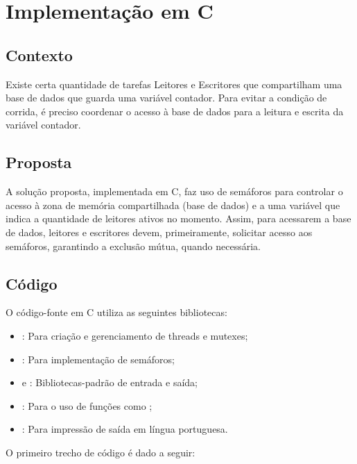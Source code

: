 \documentclass[
	12pt,				%
	openright,			%
	oneside,			%
	a4paper,			%
	chapter=TITLE,		%
	english,			%
	french,				%
	spanish,			%
	brazil				%
	]{abntex2}
\theoremstyle{definition}
\begin{document}
\section{Implementação em C}

\subsection{Contexto}

Existe certa quantidade de tarefas Leitores e Escritores que compartilham uma base de dados que guarda uma variável contador. Para evitar a condição de corrida, é preciso coordenar o acesso à base de dados para a leitura e escrita da variável contador.

\subsection{Proposta} 

A solução proposta, implementada em C, faz uso de semáforos para controlar o acesso à zona de memória compartilhada (base de dados) e a uma variável que indica a quantidade de leitores ativos no momento. Assim, para acessarem a base de dados, leitores e escritores devem, primeiramente, solicitar acesso aos semáforos, garantindo a exclusão mútua, quando necessária.

\subsection{Código}

O código-fonte em C utiliza as seguintes bibliotecas:
\begin{itemize}
    \item \textbf{}: Para criação e gerenciamento de threads e mutexes;
    \item \textbf{}: Para implementação de semáforos;
    \item \textbf{} e \textbf{}: Bibliotecas-padrão de entrada e saída;
    \item \textbf{}: Para o uso de funções como ;
    \item \textbf{}: Para impressão de saída em língua portuguesa.
\end{itemize}

O primeiro trecho de código é dado a seguir:
\end{document}
